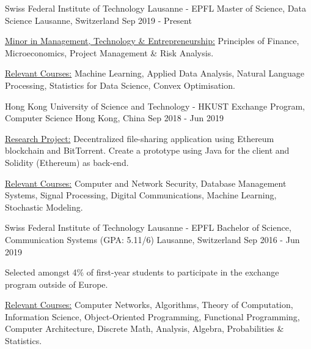 

\begin{cventries}


  \cventry
    {Swiss Federal Institute of Technology Lausanne - EPFL} %
    {Master of Science, Data Science} %
    {Lausanne, Switzerland} %
    { Sep 2019 - Present} %
    {
      \begin{cvitems} %
        \item {\underline{Minor in Management, Technology \& Entrepreneurship:} Principles of Finance, Microeconomics, Project Management \& Risk Analysis.} 
        \item {\underline{Relevant Courses:} Machine Learning, Applied Data Analysis, Natural Language Processing, Statistics for Data Science, Convex Optimisation.}
      \end{cvitems}
    }

\cventry
    {Hong Kong University of Science and Technology - HKUST} %
    {Exchange Program, Computer Science} %
    {Hong Kong, China} %
    {Sep 2018 - Jun 2019} %
    {
      \begin{cvitems} %
        \item {\underline{Research Project:} Decentralized file-sharing application using Ethereum blockchain and BitTorrent. Create a prototype using Java for the client and Solidity (Ethereum) as back-end.} 
        \item {\underline{Relevant Courses:} Computer and Network Security, Database Management Systems, Signal Processing, Digital Communications, Machine Learning, Stochastic Modeling.} 
      \end{cvitems}
    }


  \cventry
    {Swiss Federal Institute of Technology Lausanne - EPFL} %
    {Bachelor of Science, Communication Systems (GPA: 5.11/6)} %
    {Lausanne, Switzerland} %
    {Sep 2016 - Jun 2019} %
    {
      \begin{cvitems} %
        \item {Selected amongst 4\% of first-year students to participate in the exchange program outside of Europe.} 
        \item {\underline{Relevant Courses:} Computer Networks, Algorithms, Theory of Computation, Information Science, Object-Oriented Programming, Functional Programming, Computer Architecture, Discrete Math, Analysis, Algebra, Probabilities \& Statistics.}
      \end{cvitems}
    }

\end{cventries}
